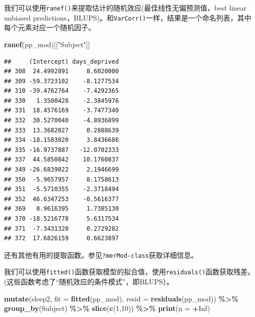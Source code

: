 \documentclass[
]{book}
\newenvironment{Shaded}{\begin{snugshade}}{\end{snugshade}}
\newcommand{\AttributeTok}[1]{\textcolor[rgb]{0.13,0.29,0.53}{#1}}
\newcommand{\ConstantTok}[1]{\textcolor[rgb]{0.56,0.35,0.01}{#1}}
\newcommand{\DecValTok}[1]{\textcolor[rgb]{0.00,0.00,0.81}{#1}}
\newcommand{\FunctionTok}[1]{\textcolor[rgb]{0.13,0.29,0.53}{\textbf{#1}}}
\newcommand{\NormalTok}[1]{#1}
\newcommand{\SpecialCharTok}[1]{\textcolor[rgb]{0.81,0.36,0.00}{\textbf{#1}}}
\newcommand{\StringTok}[1]{\textcolor[rgb]{0.31,0.60,0.02}{#1}}
\begin{document}
我们可以使用\texttt{ranef()}来提取估计的随机效应(最佳线性无偏预测值，best linear unbiased predictions，BLUPS)。和\texttt{VarCorr()}一样，结果是一个命名列表，其中每个元素对应一个随机因子。

\begin{Shaded}
\begin{Highlighting}[]
\FunctionTok{ranef}\NormalTok{(pp\_mod)[[}\StringTok{"Subject"}\NormalTok{]]}
\end{Highlighting}
\end{Shaded}

\begin{verbatim}
##     (Intercept) days_deprived
## 308  24.4992891     8.6020000
## 309 -59.3723102    -8.1277534
## 310 -39.4762764    -7.4292365
## 330   1.3500428    -2.3845976
## 331  18.4576169    -3.7477340
## 332  30.5270040    -4.8936899
## 333  13.3682027     0.2888639
## 334 -18.1583020     3.8436686
## 335 -16.9737887   -12.0702333
## 337  44.5850842    10.1760837
## 349 -26.6839022     2.1946699
## 350  -5.9657957     8.1758613
## 351  -5.5710355    -2.3718494
## 352  46.6347253    -0.5616377
## 369   0.9616395     1.7385130
## 370 -18.5216778     5.6317534
## 371  -7.3431320     0.2729282
## 372  17.6826159     0.6623897
\end{verbatim}

还有其他有用的提取函数。参见\texttt{?merMod-class}获取详细信息。

我们可以使用\texttt{fitted()}函数获取模型的拟合值，使用\texttt{residuals()}函数获取残差。(这些函数考虑了``随机效应的条件模式''，即BLUPS）。

\begin{Shaded}
\begin{Highlighting}[]
\FunctionTok{mutate}\NormalTok{(sleep2,}
       \AttributeTok{fit =} \FunctionTok{fitted}\NormalTok{(pp\_mod),}
       \AttributeTok{resid =} \FunctionTok{residuals}\NormalTok{(pp\_mod)) }\SpecialCharTok{\%\textgreater{}\%}
  \FunctionTok{group\_by}\NormalTok{(Subject) }\SpecialCharTok{\%\textgreater{}\%}
  \FunctionTok{slice}\NormalTok{(}\FunctionTok{c}\NormalTok{(}\DecValTok{1}\NormalTok{,}\DecValTok{10}\NormalTok{)) }\SpecialCharTok{\%\textgreater{}\%}
  \FunctionTok{print}\NormalTok{(}\AttributeTok{n =} \SpecialCharTok{+}\ConstantTok{Inf}\NormalTok{)}
\end{Highlighting}
\end{Shaded}
\end{document}
